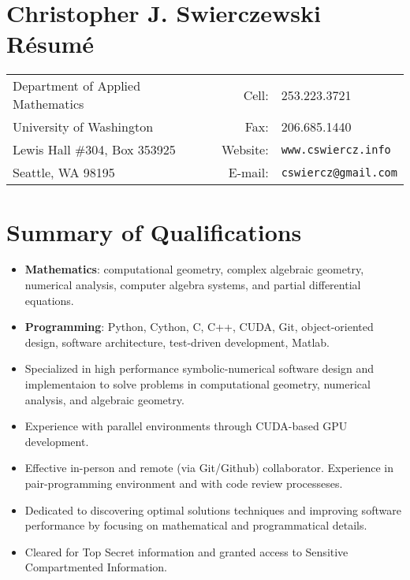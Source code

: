 \documentclass{article}
\begin{document}
\section*{Christopher J. Swierczewski \hspace{5.9cm} R\'esum\'e}

\begin{tabular}{lrl}
  Department of Applied Mathematics \hspace{5cm} & Cell:    & 253.223.3721 \\
  University of Washington          & Fax:         & 206.685.1440            \\
  Lewis Hall \#304, Box 353925      & Website:     & \tt www.cswiercz.info   \\
  Seattle, WA 98195                 & E-mail:      & \tt cswiercz@gmail.com
\end{tabular}

\section*{Summary of Qualifications}

\begin{itemize}
  \setlength{\itemsep}{0pt}
  \item {\bf Mathematics}: computational geometry, complex algebraic geometry,
    numerical analysis, computer algebra systems, and partial differential
    equations.
  \item {\bf Programming}: Python, Cython, C, C++, CUDA, Git, object-oriented
    design, software architecture, test-driven development, Matlab.
  \item Specialized in high performance symbolic-numerical software design and
    implementaion to solve problems in computational geometry, numerical
    analysis, and algebraic geometry.
  \item Experience with parallel environments through CUDA-based GPU
    development.
  \item Effective in-person and remote (via Git/Github) collaborator. Experience
    in pair-programming environment and with code review processeses.
  \item Dedicated to discovering optimal solutions techniques and improving
    software performance by focusing on mathematical and programmatical details.
  \item Cleared for Top Secret information and granted access to Sensitive
    Compartmented Information.
\end{itemize}
\end{document}
